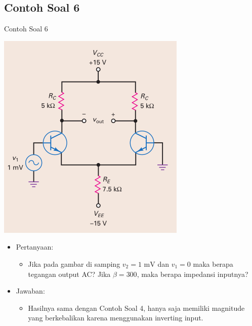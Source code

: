 \documentclass[aspectratio=169]{beamer}
\begin{document}
\subsection{Contoh Soal 6}
\begin{frame}{Contoh Soal 6}
	\begin{multicols}{2}
		\begin{center}
			\includegraphics[height=0.7\textheight]{gambar/01.contoh_soal_1-2}
		\end{center}
		\columnbreak
		\begin{itemize}
			\item Pertanyaan:
			\begin{itemize}
				\item Jika pada gambar di samping $ v_2 = 1 \text{ mV} $ dan $ v_1 = 0 $ maka berapa tegangan output AC? Jika $ \beta = 300 $, maka berapa impedansi inputnya?
			\end{itemize}
			\item Jawaban:
			\begin{itemize}
				\item Hasilnya sama dengan Contoh Soal 4, hanya saja memiliki magnitude yang berkebalikan karena menggunakan inverting input.
			\end{itemize}
		\end{itemize}
	\end{multicols}
\end{frame}
\end{document}

